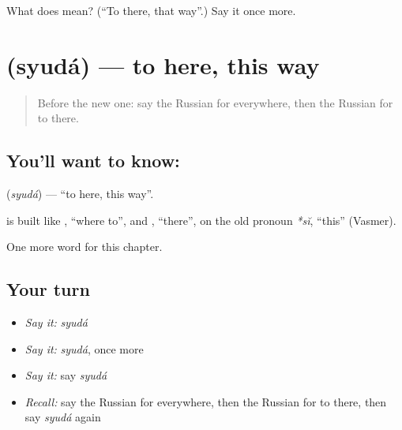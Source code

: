 \begin{tcolorbox}[breakable,colback=teal!4,colframe=teal!35!black,title={Before you move on}]
What does  mean? (\textquotedblleft{}To there, that way\textquotedblright{}.) Say it once more.
\end{tcolorbox}
\section[\texorpdfstring{\ru{сюда} (syudá)}{сюда (syudá)}]{ (syudá) — to here, this way}

\label{lesson:RU-C184-syuda}



\begin{quote}
Before the new one: say the Russian for everywhere, then the Russian for to there.
\end{quote}

\subsection*{You'll want to know: }
\textbf{} (\emph{syudá}) — \textquotedblleft{}to here, this way\textquotedblright{}.

\begin{cousinweb}
\textbf{} is built like \emph{}, \textquotedblleft{}where to\textquotedblright{}, and \emph{}, \textquotedblleft{}there\textquotedblright{}, on the old pronoun \emph{*sĭ}, \textquotedblleft{}this\textquotedblright{} (Vasmer).
\end{cousinweb}

\begin{grammarlens}[title={What you've built}]
One more word for this chapter.
\end{grammarlens}

\subsection*{Your turn}
\begin{itemize}
\raggedright
  \item \emph{Say it:} \emph{syudá}
  \item \emph{Say it:} \emph{syudá}, once more
  \item \emph{Say it:} say \emph{syudá}
  \item \emph{Recall:} say the Russian for everywhere, then the Russian for to there, then say \emph{syudá} again
\end{itemize}

